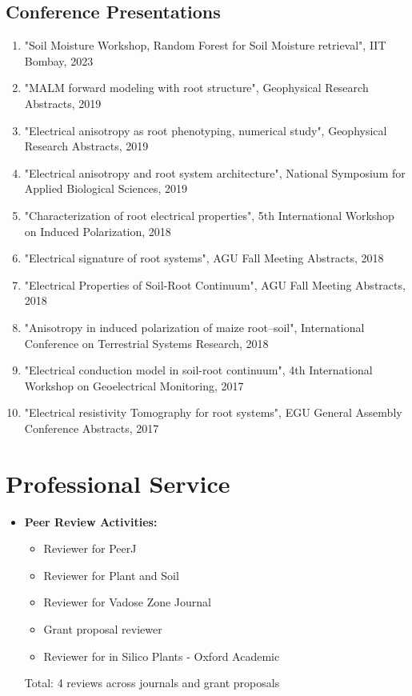 \documentclass[11pt,a4paper]{article}
\begin{document}
\subsection*{Conference Presentations}
\begin{enumerate}[leftmargin=*]
    \item "Soil Moisture Workshop, Random Forest for Soil Moisture retrieval", IIT Bombay, 2023
    \item "MALM forward modeling with root structure", Geophysical Research Abstracts, 2019
    \item "Electrical anisotropy as root phenotyping, numerical study", Geophysical Research Abstracts, 2019
    \item "Electrical anisotropy and root system architecture", National Symposium for Applied Biological Sciences, 2019
    \item "Characterization of root electrical properties", 5th International Workshop on Induced Polarization, 2018
    \item "Electrical signature of root systems", AGU Fall Meeting Abstracts, 2018
    \item "Electrical Properties of Soil-Root Continuum", AGU Fall Meeting Abstracts, 2018
    \item "Anisotropy in induced polarization of maize root--soil", International Conference on Terrestrial Systems Research, 2018
    \item "Electrical conduction model in soil-root continuum", 4th International Workshop on Geoelectrical Monitoring, 2017
    \item "Electrical resistivity Tomography for root systems", EGU General Assembly Conference Abstracts, 2017
\end{enumerate}

\section*{Professional Service}
\begin{itemize}[leftmargin=*]
    \item \textbf{Peer Review Activities:}
        \begin{itemize}
            \item Reviewer for PeerJ
            \item Reviewer for Plant and Soil
            \item Reviewer for Vadose Zone Journal
            \item Grant proposal reviewer
            \item Reviewer for in Silico Plants - Oxford Academic
        \end{itemize}
    Total: 4 reviews across journals and grant proposals
\end{itemize}
\end{document}
